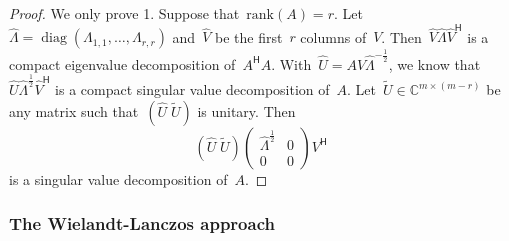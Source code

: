 \documentclass[11pt,a4paper]{article}
\theoremstyle{definition}
\def\CC{\mathbb{C}}
\newcommand{\hmt}{{\scriptscriptstyle{{\mathsf{H}}}}}
\newcommand{\rank}{\mathrm{rank}}
\newcommand{\diag}{\operatorname*{diag}}
\begin{document}
\begin{proof}
  We only prove 1. Suppose that~$\rank(A) = r$. Let~$\hat{\Lambda} = \diag(\Lambda_{1,1}, \dots,
  \Lambda_{r,r})$ and~$\hat{V}$ be the first~$r$ columns of~$V$. Then~$\hat{V} \hat{\Lambda}
  \hat{V}^\hmt$ is a compact eigenvalue decomposition of~$A^\hmt A$. With~$\hat{U}
  = A\hat{V}\hat{\Lambda}^{-\frac{1}{2}}$, we know that~$\hat{U}\hat{\Lambda}^{\frac{1}{2}}\hat{V}^\hmt$ is 
  a compact singular value decomposition of~$A$. 
  Let~$\tilde{U}\in \CC^{m\times(m-r)}$ be any matrix such that~$(\hat{U}\; \tilde{U})$ is
  unitary. Then
  \begin{equation*}
    (\hat{U}\; \tilde{U})
    \begin{pmatrix}
      \hat{\Lambda}^{\frac{1}{2}} & 0\\
      0 & 0
    \end{pmatrix}
    V^\hmt
  \end{equation*}
  is a singular value decomposition of~$A$.
\end{proof}

\subsubsection{The Wielandt-Lanczos approach~\cite{Lanczos_1958}}
\end{document}
